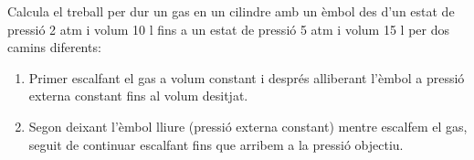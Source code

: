 \begin{exr}
    Calcula el treball per dur un gas en un cilindre amb un èmbol des d'un estat de pressió 2 atm i volum 10 l fins a un estat de pressió 5 atm i volum 15 l per dos camins diferents:
    \begin{enumerate}
    \item Primer escalfant el gas a volum constant i després alliberant l'èmbol a pressió externa constant fins al volum desitjat.
    \item Segon deixant l'èmbol lliure (pressió externa constant) mentre escalfem el gas, seguit de continuar escalfant fins que arribem a la pressió objectiu.  
    \end{enumerate}
    \end{exr}